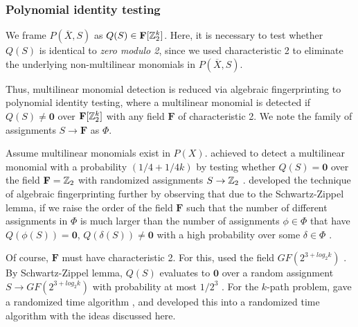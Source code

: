 \subsubsection{Polynomial identity testing}

\begin{problem}
\end{problem}

We frame $P(\overbar{X}, S)$ as $Q(S) \in \mathbf{F}[\mathbb Z_2^k]$. 
Here, it is necessary to test whether $Q(S)$ is identical to \emph{zero modulo 2}, 
since we used characteristic 2 to eliminate 
the underlying non-multilinear monomials in $P(\overbar{X}, S)$.

Thus, multilinear monomial detection is reduced via algebraic fingerprinting 
to polynomial identity testing, where a multilinear monomial is detected if 
$Q(S) \neq \mathbf{0}$ over $\mathbf{F}[\mathbb Z_2^k]$ with any field $\mathbf{F}$ of characteristic 2. 
We note the family of assignments $S \to \mathbf{F}$ as $\Phi$.

Assume multilinear monomials exist in $P(X)$. 
\citeauthor{Koutis08} achieved to detect a multilinear monomial 
with a probability $(1/4 + 1/{4k})$ by testing whether 
$Q(S) = \mathbf{0}$ over the field $\mathbf{F} = \mathbb Z_2$  
with randomized assignments $S \to \mathbb Z_2$ \cite{Koutis08}. 
\citeauthor{Williams09} developed the technique of algebraic fingerprinting 
further by observing that due to the Schwartz-Zippel lemma, %
if we raise the order of the field $\mathbf{F}$ 
such that the number of different assignments in $\Phi$ is much larger than 
the number of assignments $\phi \in \Phi$ that have $Q(\phi(S)) = \mathbf{0}$, 
$Q(\delta(S)) \neq \mathbf{0}$ with a high probability over some $\delta \in \Phi$ 
\cite{Williams09}. 

Of course, $\mathbf{F}$ must have characteristic 2. For this, \citeauthor{Williams09} 
used the field $GF(2^{3+log_2k})$ \cite{Williams09}. By Schwartz-Zippel lemma, $Q(S)$ 
evaluates to $\mathbf{0}$ over a random assignment $S \to GF(2^{3+log_2k})$ with probability 
at most $1/2^3$ \cite{Williams09}. For the $k$-path problem, \citeauthor{Koutis08} 
gave a randomized  time algorithm \cite{Koutis08}, 
and \citeauthor{Williams09} developed this into a randomized  
time algorithm \cite{Williams09} with the ideas discussed here.

